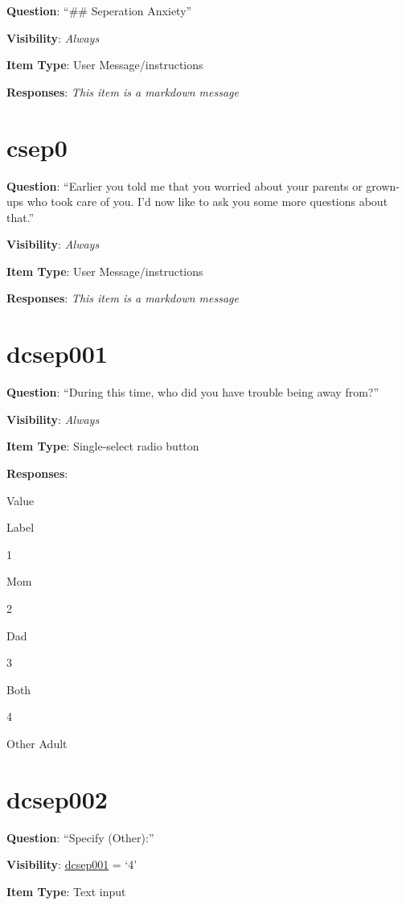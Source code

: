 \documentclass[]{book}
\begin{document}
\textbf{Question}: ``\#\# Seperation Anxiety''

\textbf{Visibility}: \emph{Always}

\textbf{Item Type}: User Message/instructions

\textbf{Responses}: \emph{This item is a markdown message}

\hypertarget{csep0}{%
\section{csep0}\label{csep0}}

\textbf{Question}: ``Earlier you told me that you worried about your parents or grown-ups who took care of you. I'd now like to ask you some more questions about that.''

\textbf{Visibility}: \emph{Always}

\textbf{Item Type}: User Message/instructions

\textbf{Responses}: \emph{This item is a markdown message}

\hypertarget{dcsep001}{%
\section{dcsep001}\label{dcsep001}}

\textbf{Question}: ``During this time, who did you have trouble being away from?''

\textbf{Visibility}: \emph{Always}

\textbf{Item Type}: Single-select radio button

\textbf{Responses}:

Value

Label

1

Mom

2

Dad

3

Both

4

Other Adult

\hypertarget{dcsep002}{%
\section{dcsep002}\label{dcsep002}}

\textbf{Question}: ``Specify (Other):''

\textbf{Visibility}: \protect\hyperlink{dcsep001}{dcsep001} = `4'

\textbf{Item Type}: Text input
\end{document}
